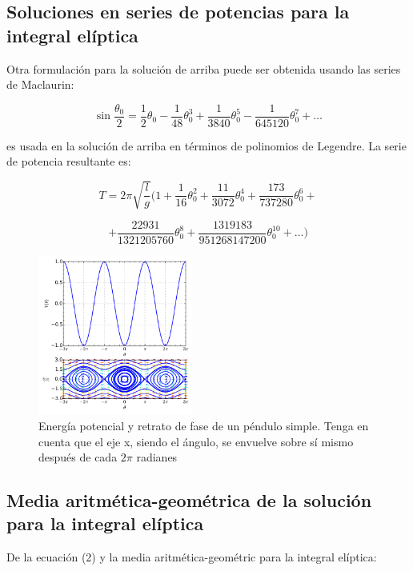 \documentclass[DIV=calc, paper=a4, fontsize=12pt, twocolumn]{scrartcl}	 %
\begin{document}
\subsection*{Soluciones en series de potencias para la integral elíptica}
\vspace{0.5cm}

Otra formulación para la solución de arriba puede ser obtenida usando las series de Maclaurin:

$$ \sin{\frac{\theta_{0}}{2}} = \frac{1}{2}\theta_{0} - \frac{1}{48}\theta_{0}^{3} + \frac{1}{3840}\theta_{0}^{5} - \frac{1}{645120}\theta_{0}^{7} + \ldots $$

es usada en la solución de arriba en términos de polinomios de Legendre. La serie de potencia resultante es:

$$T=2\pi\sqrt{\frac{l}{g}}(1+\frac{1}{16}\theta_{0}^{2} + \frac{11}{3072}\theta_{0}^{4} + \frac{173}{737280}\theta_{0}^{6}+$$

$$ + \frac{22931}{1321205760}\theta_{0}^{8} + \frac{1319183}{951268147200}\theta_{0}^{10} + \ldots )$$

\begin{figure}[hb]
  \centering
  \includegraphics[width=2in]{pendulosimple6.png}
  \caption[Close up of \textit{Hemidactylus} sp.]
   {Energía potencial y retrato de fase de un péndulo simple. Tenga en cuenta que el eje x, siendo el ángulo, se envuelve sobre sí mismo después de cada $2\pi$ radianes}
\end{figure}
\vspace{0.5cm}

\subsection*{Media aritmética-geométrica de la solución para la integral elíptica}
\vspace{0.5cm}

De la ecuación (2) y la media aritmética-geométric para la integral elíptica:
\end{document}
